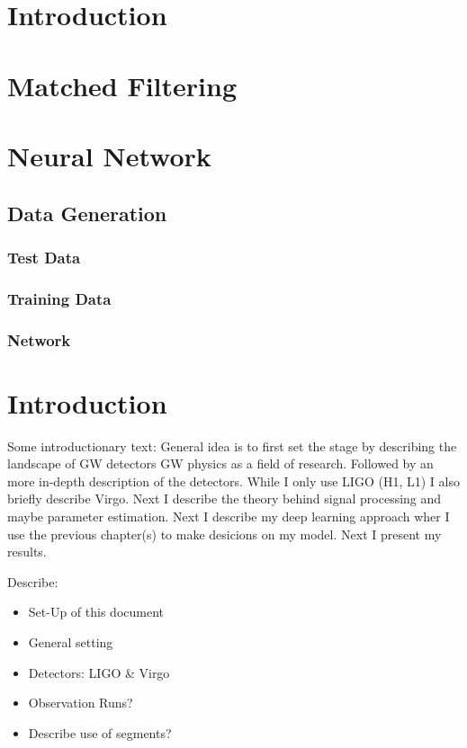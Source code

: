 \documentclass[12pt]{article}
\begin{document}
\maketitle

\section{Introduction}
\section{Matched Filtering}
\section{Neural Network}
\subsection{Data Generation}
\subsubsection{Test Data}
\subsubsection{Training Data}
\subsubsection{Network}



\section{Introduction}
Some introductionary text: General idea is to first set the stage by describing
the landscape of GW detectors GW physics as a field of research. Followed by an
more in-depth description of the detectors. While I only use LIGO (H1, L1) I
also briefly describe Virgo. Next I describe the theory behind signal processing
and maybe parameter estimation. Next I describe my deep learning approach wher I
use the previous chapter(s) to make desicions on my model. Next I present my
  results.

Describe:
\begin{itemize}
  \item Set-Up of this document
  \item General setting
  \item Detectors: LIGO \& Virgo
  \item Observation Runs?
  \item Describe use of segments?
\end{itemize}
\end{document}
